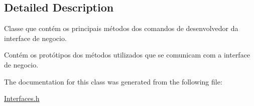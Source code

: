 \subsection{Detailed Description}
Classe que contém os principais métodos dos comandos de desenvolvedor da interface de negocio. 

Contém os protótipos dos métodos utilizados que se comunicam com a interface de negocio. 

The documentation for this class was generated from the following file\+:\begin{DoxyCompactItemize}
\item 
\hyperlink{_interfaces_8h}{Interfaces.\+h}\end{DoxyCompactItemize}
